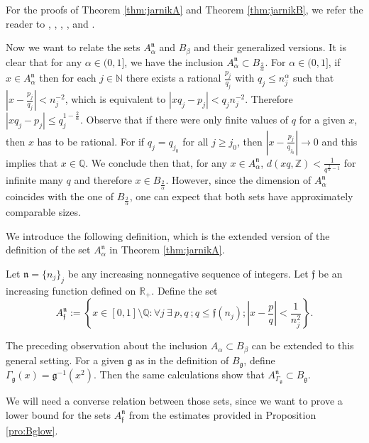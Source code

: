 \documentclass[11pt,a4paper]{amsart}
\begin{document}
For the proofs of Theorem \ref{thm:jarnikA} and
Theorem \ref{thm:jarnikB}, we refer the reader to \cite{jar31},
\cite{bes34}, \cite{egg52}, \cite{fal86}, and \cite{fal03}.

Now we want to relate the sets $A^{\mathfrak{n}}_\alpha$ and $B_\beta$ and their generalized versions. It is clear that for any $\alpha\in (0,1]$, we have the inclusion
$A^{\mathfrak{n}}_\alpha\subset B_\frac{2}{\alpha}$. For $\alpha\in (0,1]$, if $x\in A^{\mathfrak{n}}_\alpha$ then for each $j\in{\mathbb{N}}$ there exists a rational $\frac{p_j}{q_j}$ with $q_j\le n^\alpha_j$ such that $|x-\frac{p_j}{q_j}|<n_j^{-2}$, which is equivalent to $|xq_j-p_j|<q_jn_j^{-2}$. Therefore $|xq_j-p_j|\le q_j^{1-\frac{2}{\alpha}}$. Observe that if there were only finite values of $q$  for a given $x$, then $x$ has to be rational. For if $q_j=q_{j_0}$ for all $j\ge j_0$, then $|x-\frac{p_j}{q_{j_0}}|\to 0$ and this implies that $x\in {\mathbb{Q}}$. We conclude then that, for any $x\in A^{\mathfrak{n}}_\alpha$, $d(xq,\mathbb Z)<\frac{1}{q^{\frac{2}{\alpha}-1}}$ for infinite many $q$ and therefore $x\in B_{\frac{2}{\alpha}}$. However, since the dimension of $A^{\mathfrak{n}}_\alpha$ coincides with the one of
$B_\frac{2}{\alpha}$, one can expect that both sets have approximately comparable sizes.

We introduce the following  definition, which is the extended version of the definition of the  set $A^{\mathfrak{n}}_\alpha$ in Theorem \ref{thm:jarnikA}.

\begin{definition}\label{def:jarnikh}
Let ${\mathfrak{n}}=\{n_j\}_j$ be any increasing nonnegative sequence of
integers. Let ${\mathfrak{f}}$ be an increasing function  defined on ${\mathbb{R}}_+$.
Define the set
\begin{equation*}
A^{\mathfrak{n}}_{\mathfrak{f}}:=\left\{x\in[0,1]\setminus {\mathbb{Q}}: \forall j\ \exists\ p,q\ ;
q\le {\mathfrak{f}}(n_j); |x-\frac{p}{q}|<\frac{1}{n_j^2}\right\}.
\end{equation*} 
\end{definition}
The preceding observation about the inclusion $A_\alpha\subset
B_\beta$ can be extended to this general setting. For a given
${\mathfrak{g}}$ as in the definition of $B_{\mathfrak{g}}$, define
$\Gamma_{\mathfrak{g}}(x)={\mathfrak{g}}^{-1}(x^2)$. Then the same calculations show that
$A^{\mathfrak{n}}_{\Gamma_{\mathfrak{g}}} \subset B_{\mathfrak{g}}$.

We will need a converse relation between those sets, since we
want to prove a lower bound for the sets $A^{\mathfrak{n}}_{\mathfrak{f}}$ from the
estimates provided in Proposition \ref{pro:Bglow}.
\end{document}
